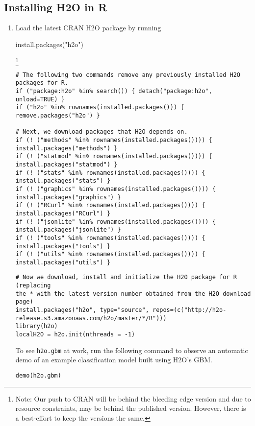 \subsection{Installing H2O in R}
\begin{enumerate}
\item Load the latest CRAN H2O package by running \begin{spverbatim} install.packages("h2o") \end{spverbatim}\footnote{Note: Our push to CRAN will be behind the bleeding edge version and due to resource constraints, may be behind the published version. However, there is a best-effort to keep the versions the same.} 

\begin{lstlisting}[style=R]
# The following two commands remove any previously installed H2O packages for R.
if ("package:h2o" %in% search()) { detach("package:h2o", unload=TRUE) }
if ("h2o" %in% rownames(installed.packages())) { remove.packages("h2o") }

# Next, we download packages that H2O depends on.
if (! ("methods" %in% rownames(installed.packages()))) { install.packages("methods") }
if (! ("statmod" %in% rownames(installed.packages()))) { install.packages("statmod") }
if (! ("stats" %in% rownames(installed.packages()))) { install.packages("stats") }
if (! ("graphics" %in% rownames(installed.packages()))) { install.packages("graphics") }
if (! ("RCurl" %in% rownames(installed.packages()))) { install.packages("RCurl") }
if (! ("jsonlite" %in% rownames(installed.packages()))) { install.packages("jsonlite") }
if (! ("tools" %in% rownames(installed.packages()))) { install.packages("tools") }
if (! ("utils" %in% rownames(installed.packages()))) { install.packages("utils") }
\end{lstlisting}
\begin{lstlisting}[style=R]
# Now we download, install and initialize the H2O package for R (replacing
the * with the latest version number obtained from the H2O download page)
install.packages("h2o", type="source", repos=(c("http://h2o-release.s3.amazonaws.com/h2o/master/*/R")))
library(h2o)
localH2O = h2o.init(nthreads = -1)
\end{lstlisting}
\normalsize%
To see {\texttt{h2o.gbm}} at work, run the following command to observe an automatic demo of an example classification model built using H2O's GBM.

\begin{lstlisting}[style=R]
demo(h2o.gbm)
\end{lstlisting}
\end{enumerate}

